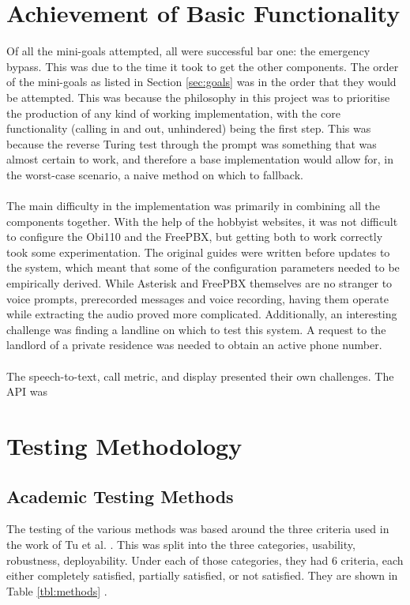 \documentclass[main.tex]{subfiles}
\begin{document}
\section{Achievement of Basic Functionality}
Of all the mini-goals attempted, all were successful bar one: the emergency bypass. This was due to the time it took to get the other components. The order of the mini-goals as listed in Section \ref{sec:goals} was in the order that they would be attempted. This was because the philosophy in this project was to prioritise the production of any kind of working implementation, with the core functionality (calling in and out, unhindered) being the first step. This was because the reverse Turing test through the prompt was something that was almost certain to work, and therefore a base implementation would allow for, in the worst-case scenario, a naive method on which to fallback.
\\\\
The main difficulty in the implementation was primarily in combining all the components together. With the help of the hobbyist websites, it was not difficult to configure the Obi110 and the FreePBX, but getting both to work correctly took some experimentation. The original guides were written before updates to the system, which meant that some of the configuration parameters needed to be empirically derived. While Asterisk and FreePBX themselves are no stranger to voice prompts, prerecorded messages and voice recording, having them operate while extracting the audio proved more complicated. Additionally, an interesting challenge was finding a landline on which to test this system. A request to the landlord of a private residence was needed to obtain an active phone number.
\\\\
The speech-to-text, call metric, and display presented their own challenges. The API was

\section{Testing Methodology}
\subsection{Academic Testing Methods}
The testing of the various methods was based around the three criteria used in the work of Tu et al. \cite{cisco}. This was split into the three categories, usability, robustness, deployability. Under each of those categories, they had 6 criteria, each either completely satisfied, partially satisfied, or not satisfied. They are shown in Table \ref{tbl:methods} \cite{cisco}.
\end{document}
